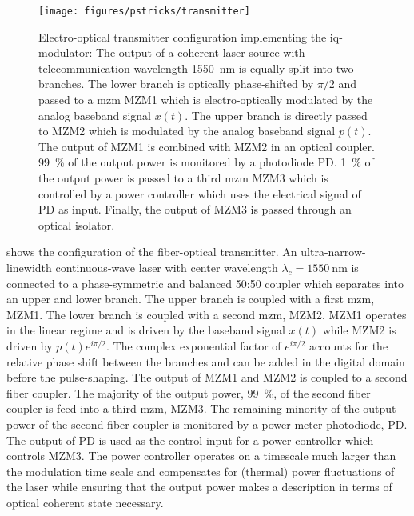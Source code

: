 \begin{figure}[htb]
	\centering
	\texttt{[image: figures/pstricks/transmitter]}
	\caption{Electro-optical transmitter configuration implementing the \gls{iq}-modulator: The output of a coherent laser source with telecommunication wavelength \SI{1550}{\nano\meter} is equally split into two branches. The lower branch is optically phase-shifted by $\pi/2$ and passed to a \gls{mzm} MZM1 which is electro-optically modulated by the analog baseband signal $x(t)$. The upper branch is directly passed to MZM2 which is modulated by the analog baseband signal $p(t)$. The output of MZM1 is combined with MZM2 in an optical coupler. \SI{99}{\percent} of the output power is monitored by a photodiode PD. \SI{1}{\percent} of the output power is passed to a third \gls{mzm} MZM3 which is controlled by a power controller which uses the electrical signal of PD as input. Finally, the output of MZM3 is passed through an optical isolator.}\label{fig:optical_transmitter}
\end{figure}
 shows the configuration of the fiber-optical transmitter.
An ultra-narrow-linewidth continuous-wave laser with center wavelength $\lambda_c=\SI{1550}{\nano\meter}$ is connected to a phase-symmetric and balanced 50:50 coupler which separates into an upper and lower branch.
The upper branch is coupled with a first \gls{mzm}, MZM1.
The lower branch is coupled with a second \gls{mzm}, MZM2.
MZM1 operates in the linear regime and is driven by the baseband signal $x(t)$ while MZM2 is driven by $p(t)e^{i\pi/2}$.
The complex exponential factor of $e^{i\pi/2}$ accounts for the relative phase shift between the branches and can be added in the digital domain before the pulse-shaping.
The output of MZM1 and MZM2 is coupled to a second fiber coupler.
The majority of the output power, \SI{99}{\percent}, of the second fiber coupler is feed into a third \gls{mzm}, MZM3.
The remaining minority of the output power of the second fiber coupler is monitored by a power meter photodiode, PD.
The output of PD is used as the control input for a power controller which controls MZM3.
The power controller operates on a timescale much larger than the modulation time scale and compensates for (thermal) power fluctuations of the laser while ensuring that the output power makes a description in terms of optical coherent state necessary.


